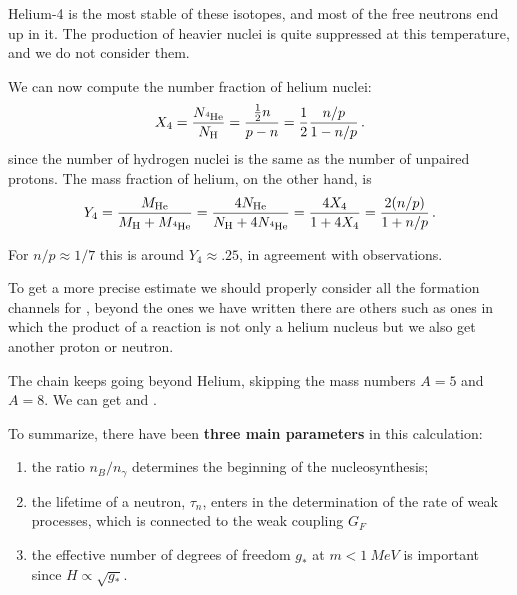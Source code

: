 \documentclass[main.tex]{subfiles}
\begin{document}
Helium-4 is the most stable of these isotopes, and most of the free neutrons end up in it. 
The production of heavier nuclei is quite suppressed at this temperature, and we do not consider them.


We can now compute the number fraction of helium nuclei: 
%
\begin{align}
X_4 = \frac{N_{\ce{^{4}He}}}{N_{\ce{H}}} 
= \frac{ \frac{1}{2} n }{p - n}
= \frac{1}{2} \frac{n/p}{1 - n/p}
\,.
\end{align}
%
since the number of hydrogen nuclei is the same as the number of unpaired protons. 
The mass fraction of helium, on the other hand, is
%
\begin{align}
Y_{4} 
= \frac{M_{\ce{He}}}{M_{\ce{H}} + M_{\ce{^{4}He}}} 
= \frac{4 N_{\ce{He}}}{N_{\ce{H}} + 4 N_{\ce{^{4}He}}} 
= \frac{4 X_4}{1 + 4 X_4} = \frac{2 (n/p)}{1 + n/p}
\,.
\end{align}

For \(n / p \approx 1/7\) this is around \(Y_4 \approx \num{.25}\), in agreement with observations.

To get a more precise estimate we should properly consider all the formation channels for , beyond the ones we have written there are others such as ones in which the product of a reaction is not only a helium nucleus but we also get another proton or neutron. 

The chain keeps going beyond Helium, skipping the mass numbers \(A = 5\) and \(A= 8 \). We can get  and . 

To summarize, there have been \textbf{three main parameters} in this calculation: 
\begin{enumerate}
    \item the ratio \(n_B / n_\gamma \) determines the beginning of the nucleosynthesis;
    \item the lifetime of a neutron, \(\tau_{n}\), enters in the determination of the rate of weak processes, which is connected to the weak coupling \(G_F\) 
    \item the effective number of degrees of freedom \(g_*\) at \(m < \SI{1}{MeV}\) is important since \(H \propto \sqrt{g_*}\).
\end{enumerate}
\end{document}
